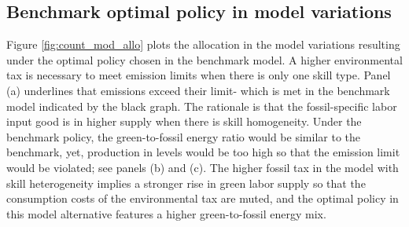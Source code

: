 \subsection{Benchmark optimal policy in model variations}\label{app:count}
Figure  \ref{fig:count_mod_allo} plots the allocation in the model variations resulting under the optimal policy chosen in the benchmark model. 
A higher environmental tax is necessary to meet emission limits when there is only one skill type. Panel (a) underlines that emissions exceed their limit- which is met in the benchmark model indicated by the black graph. The rationale is that the fossil-specific labor input good is in higher supply when there is skill homogeneity. Under the benchmark policy, the green-to-fossil energy ratio would be similar to the benchmark, yet, production in levels would be too high so that the emission limit would be violated; see panels (b) and (c).  The higher fossil tax in the model with skill heterogeneity implies a stronger rise in green labor supply so that the consumption costs of the environmental tax are muted, and the optimal policy in this model alternative features a higher green-to-fossil energy mix.

